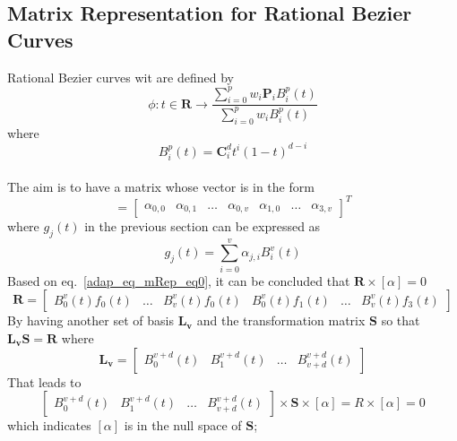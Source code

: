 \subsection{Matrix Representation for Rational Bezier Curves}
Rational Bezier curves wit are defined by 
\begin{equation}
	\phi:t\in \mathbf{R}\rightarrow \frac{\sum_{i=0}^pw_i\mathbf{P}_iB_i^p(t) }{\sum_{i=0}^pw_iB_i^p(t)}
\end{equation}
where
    \begin{equation}
        B_i^p(t) = \mathbf{C}_i^dt^i(1-t)^{d-i}
        \label{adap_eq_mrep_bbasis}
    \end{equation}

\paragraph{}
The aim is to have a matrix whose vector is in the form 
    \begin{equation}
        [\alpha] =
        \begin{bmatrix}
            \alpha_{0,0} & \alpha_{0,1}&  \dots&  \alpha_{0,v} & \alpha_{1,0} & \dots & \alpha_{3,v} 
        \end{bmatrix}^T
    \end{equation}
where $g_j(t)$ in the previous section can be expressed as
    \begin{equation}
        g_j(t) = \sum_{i=0}^v \alpha_{j,i}B_i^v(t)
    \end{equation}
Based on eq.~\eqref{adap_eq_mRep_eq0}, it can be concluded that $\mathbf{R}\times\left[\alpha\right]=0$
    \begin{equation}
        \mathbf{R} = 
        \begin{bmatrix}
            B_0^v(t)f_0(t) & \dots & B_v^v(t)f_0(t) & B_0^v(t)f_1(t) & \dots & B_v^v(t)f_3(t)
        \end{bmatrix}
    \end{equation}
By having another set of basis $\mathbf{L_v}$ and the transformation matrix $\mathbf{S}$ so that $\mathbf{L_vS}=\mathbf{R}$ where
    \begin{equation}
        \mathbf{L_v}=
        \begin{bmatrix}
            B_0^{v+d}(t) & B_1^{v+d}(t) & \dots & B_{v+d}^{v+d}(t)
        \end{bmatrix}
    \end{equation}
That leads to
    \begin{equation}
        \begin{bmatrix}
            B_0^{v+d}(t) & B_1^{v+d}(t) & \dots & B_{v+d}^{v+d}(t)
        \end{bmatrix}\times \mathbf{S}\times\left[\alpha\right] = R\times\left[\alpha\right] = 0
    \end{equation}
which indicates $\left[ \alpha\right]$ is in the null space of $\mathbf{S}$;
